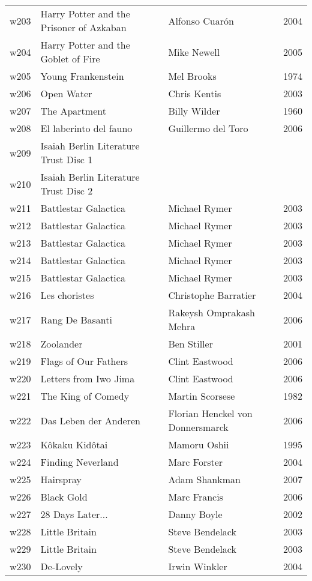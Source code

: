 \documentclass{article}
\begin{document}
\begin {center}
\begin{longtable}{l p{10cm} l l}
w203 & Harry Potter and the Prisoner of Azkaban & Alfonso Cuarón & 2004 \\
w204 & Harry Potter and the Goblet of Fire & Mike Newell & 2005 \\
w205 & Young Frankenstein & Mel Brooks & 1974 \\
w206 & Open Water & Chris Kentis & 2003 \\
w207 & The Apartment & Billy Wilder & 1960 \\
w208 & El laberinto del fauno & Guillermo del Toro & 2006 \\
w209 & Isaiah Berlin Literature Trust Disc 1 &  &  \\
w210 & Isaiah Berlin Literature Trust Disc 2 &  &  \\
w211 & Battlestar Galactica & Michael Rymer & 2003 \\
w212 & Battlestar Galactica & Michael Rymer & 2003 \\
w213 & Battlestar Galactica & Michael Rymer & 2003 \\
w214 & Battlestar Galactica & Michael Rymer & 2003 \\
w215 & Battlestar Galactica & Michael Rymer & 2003 \\
w216 & Les choristes & Christophe Barratier & 2004 \\
w217 & Rang De Basanti & Rakeysh Omprakash Mehra & 2006 \\
w218 & Zoolander & Ben Stiller & 2001 \\
w219 & Flags of Our Fathers & Clint Eastwood & 2006 \\
w220 & Letters from Iwo Jima & Clint Eastwood & 2006 \\
w221 & The King of Comedy & Martin Scorsese & 1982 \\
w222 & Das Leben der Anderen & Florian Henckel von Donnersmarck & 2006 \\
w223 & Kôkaku Kidôtai & Mamoru Oshii & 1995 \\
w224 & Finding Neverland & Marc Forster & 2004 \\
w225 & Hairspray & Adam Shankman & 2007 \\
w226 & Black Gold & Marc Francis & 2006 \\
w227 & 28 Days Later... & Danny Boyle & 2002 \\
w228 & Little Britain & Steve Bendelack & 2003 \\
w229 & Little Britain & Steve Bendelack & 2003 \\
w230 & De-Lovely & Irwin Winkler & 2004 \\

\end{longtable}
\end{center}
\end{document}

